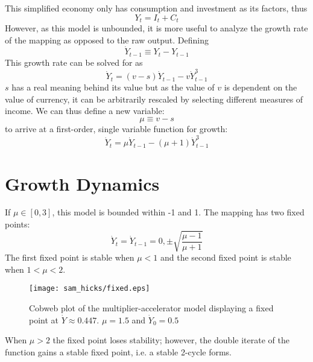 This simplified economy only has consumption and investment as its factors, thus
\begin{equation}
    Y_t=I_t+C_t
\end{equation}
However, as this model is unbounded, it is more useful to analyze the growth rate of the mapping as opposed to the raw output. Defining 
\begin{equation}
    \dot Y_{t-1}\equiv Y_t-Y_{t-1}
\end{equation}
This growth rate can be solved for as
\begin{equation*}
    \dot Y_t=(v-s)\dot Y_{t-1}-v\dot Y_{t-1}^3
\end{equation*}
$s$ has a real meaning behind its value but as the value of $v$ is dependent on the value of currency, it can be arbitrarily rescaled by selecting different measures of income. We can thus define a new variable:
\begin{equation*}
    \mu\equiv v-s
\end{equation*}
to arrive at a first-order, single variable function for growth:
\begin{equation}
    \dot Y_t=\mu \dot Y_{t-1}-(\mu+1)\dot Y_{t-1}^3
\end{equation}

\section{Growth Dynamics}
If $\mu\in[0,3]$, this model is bounded within -1 and 1. The mapping has two fixed points:
\begin{equation}
    \dot Y_t=\dot Y_{t-1}=0,\pm\sqrt{\frac{\mu-1}{\mu+1}}
\end{equation}
The first fixed point is stable when $\mu<1$ and the second fixed point is stable when $1<\mu<2$.
\begin{figure}
    \centering
    \texttt{[image: sam\_hicks/fixed.eps]}
    \caption{Cobweb plot of the multiplier-accelerator model displaying a fixed point at $\dot Y\approx0.447$. $\mu=1.5$ and $\dot Y_0=0.5$}
    \label{mult_fixed}
\end{figure}

When $\mu>2$ the fixed point loses stability; however, the double iterate of the function gains a stable fixed point, i.e. a stable 2-cycle forms. 

